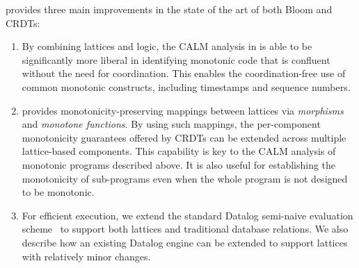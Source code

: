 \lang provides three main improvements in the state of the art of both Bloom and CRDTs:  
\begin{enumerate}
\item By combining lattices and logic, the CALM analysis in \lang is able to be
  significantly more liberal in identifying monotonic code that is confluent
  without the need for coordination.  This enables the coordination-free use of
  common monotonic constructs, including timestamps and sequence numbers.

\item {\lang} provides monotonicity-preserving mappings between lattices via
  \emph{morphisms} and \emph{monotone functions}.  By using such mappings, the
  per-component monotonicity guarantees offered by CRDTs can be extended across
  multiple lattice-based components.  This capability is key to the CALM
  analysis of monotonic \lang programs described above.  It is also useful for
  establishing the monotonicity of sub-programs even when the whole program is
  not designed to be monotonic.

\item For efficient execution, we extend the standard Datalog semi-naive
  evaluation scheme~\cite{Balbin1987} to support both lattices and traditional
  database relations. We also describe how an existing Datalog engine can be
  extended to support lattices with relatively minor changes.
\end{enumerate}

% 

